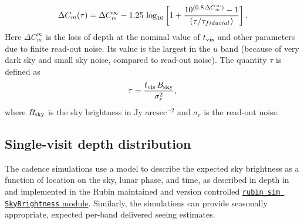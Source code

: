 \documentclass[PST,authoryear,toc]{lsstdoc}
\newcommand{\cm}{\ensuremath{C_m}}
\begin{document}
\begin{equation}
\label{eq:dCm}
 \Delta C_m(\tau) = \Delta C^\infty_m - 1.25\,\log_{10}\left[1 + {10^{(0.8 \, \Delta C^\infty_m)} - 1 \over (\tau / \tau_{fiducial})}  \right].
\end{equation}
Here $\Delta C^\infty_m$ is the loss of depth at the nominal value of $t_{\rm vis}$ and
other parameters due to finite read-out noise.
Its value is the largest in the $u$ band (because of very dark sky and small sky
noise, compared to read-out noise). The quantity $\tau$ is defined as
\begin{equation}
        \tau =  {t_{\rm vis}\, B_{\rm sky} \over \sigma^2_{r}},
\end{equation}
where $B_{\rm sky}$ is the sky brightness in Jy arcsec$^{-2}$ and $\sigma_{r}$ is the read-out noise.


\subsection{Single-visit depth distribution}\label{sec:singlevisit}


The cadence simulations use a model to describe the expected sky brightness as a function of location on the sky, lunar phase, and time, as described in depth in \href{https://www.osti.gov/biblio/1784946}{{\citet{osti_1784946}}} and implemented in the Rubin maintained and version controlled
\href{https://github.com/lsst/rubin_sim/tree/main/rubin_sim/skybrightness}{{\tt rubin\_sim SkyBrightness} module}.
Similarly, the simulations can provide seasonally appropriate, expected per-band delivered seeing estimates. %
\end{document}
